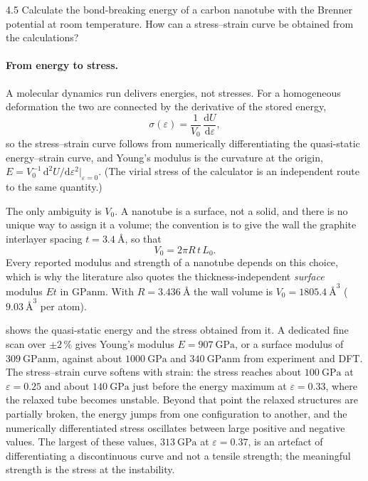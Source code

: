 \documentclass[11pt,a4paper]{article}
\numberwithin{equation}{section}
\theoremstyle{remark}
\begin{document}
\begin{task}{4.5}
  Calculate the bond-breaking energy of a carbon nanotube with the Brenner potential at room
  temperature. How can a stress--strain curve be obtained from the calculations?
\end{task}

\paragraph{From energy to stress.}
A molecular dynamics run delivers energies, not stresses. For a homogeneous deformation the two are
connected by the derivative of the stored energy,
\begin{equation}\label{eq:stressfromE}
  \sigma(\varepsilon) = \frac{1}{V_0}\,\frac{\mathrm{d}U}{\mathrm{d}\varepsilon},
\end{equation}
so the stress--strain curve follows from numerically differentiating the quasi-static energy--strain
curve, and Young's modulus is the curvature at the origin,
$E = V_0^{-1}\,\mathrm{d}^2U/\mathrm{d}\varepsilon^2|_{\varepsilon=0}$. (The virial stress of the
calculator is an independent route to the same quantity.)

The only ambiguity is $V_0$. A nanotube is a surface, not a solid, and there is no unique way to assign
it a volume; the convention is to give the wall the graphite interlayer spacing
$t = \SI{3.4}{\angstrom}$, so that
\begin{equation}\label{eq:volume}
  V_0 = 2\pi R\,t\,L_0.
\end{equation}
Every reported modulus and strength of a nanotube depends on this choice, which is why the literature
also quotes the thickness-independent \emph{surface} modulus $Et$ in $\si{\giga\pascal\nano\metre}$.
With $R = \SI{3.436}{\angstrom}$ the wall volume is $V_0 = \SI{1805.4}{\angstrom\cubed}$
($\SI{9.03}{\angstrom\cubed}$ per atom).

 shows the quasi-static energy and the stress obtained from it. A dedicated fine
scan over $\pm2\,\%$ gives Young's modulus $E = \SI{907}{\giga\pascal}$, or a surface modulus of
$\SI{309}{\giga\pascal\nano\metre}$, against about $\SI{1000}{\giga\pascal}$ and
$\SI{340}{\giga\pascal\nano\metre}$ from experiment and DFT. The stress--strain curve softens with
strain: the stress reaches about $\SI{100}{\giga\pascal}$ at $\varepsilon = 0.25$ and about
$\SI{140}{\giga\pascal}$ just before the energy maximum at $\varepsilon = 0.33$, where the relaxed tube
becomes unstable. Beyond that point the relaxed structures are partially broken, the energy jumps from
one configuration to another, and the numerically differentiated stress oscillates between large
positive and negative values. The largest of these values, $\SI{313}{\giga\pascal}$ at
$\varepsilon = 0.37$, is an artefact of differentiating a discontinuous curve and not a tensile
strength; the meaningful strength is the stress at the instability.
\end{document}
